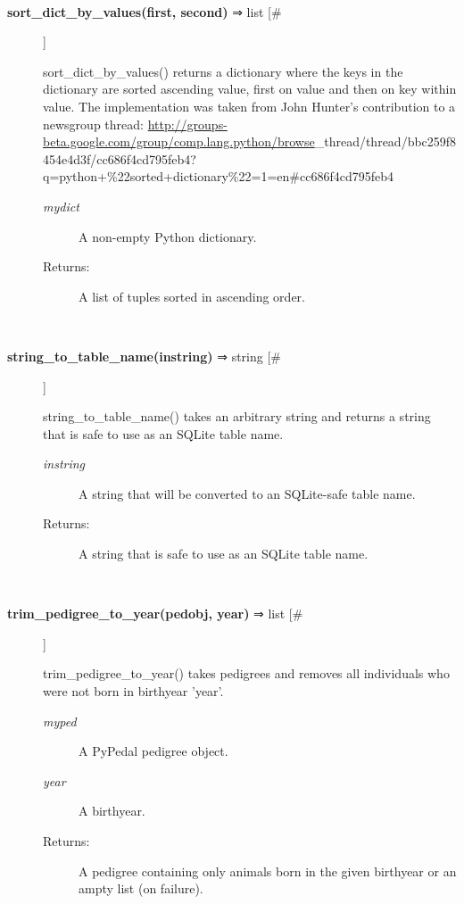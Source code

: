 \begin{description}
\begin{description}
\end{description}
\\ 

\item[\textbf{sort\_dict\_by\_values(first, second)}
 ⇒ list [\#]]

 sort\_dict\_by\_values() returns a dictionary where the keys in the dictionary are sorted ascending value, first on value and then on key within value. The implementation was taken from John Hunter's contribution to a newsgroup thread: \url{http://groups-beta.google.com/group/comp.lang.python/browse}\_thread/thread/bbc259f8454e4d3f/cc686f4cd795feb4?q=python+\%22sorted+dictionary\%22=1=en\#cc686f4cd795feb4 
\begin{description}
\item[\emph{mydict}
] A non-empty Python dictionary.
\item[Returns:] A list of tuples sorted in ascending order.

\end{description}
\\ 

\item[\textbf{string\_to\_table\_name(instring)}
 ⇒ string [\#]]

 string\_to\_table\_name() takes an arbitrary string and returns a string that is safe to use as an SQLite table name.
\begin{description}
\item[\emph{instring}
] A string that will be converted to an SQLite-safe table name.
\item[Returns:] A string that is safe to use as an SQLite table name.

\end{description}
\\ 

\item[\textbf{trim\_pedigree\_to\_year(pedobj, year)}
 ⇒ list [\#]]

 trim\_pedigree\_to\_year() takes pedigrees and removes all individuals who were not born in birthyear 'year'.
\begin{description}
\item[\emph{myped}
] A PyPedal pedigree object.
\item[\emph{year}
] A birthyear.
\item[Returns:] A pedigree containing only animals born in the given birthyear or an ampty list (on failure).

\end{description}
\\ 


\end{description}

